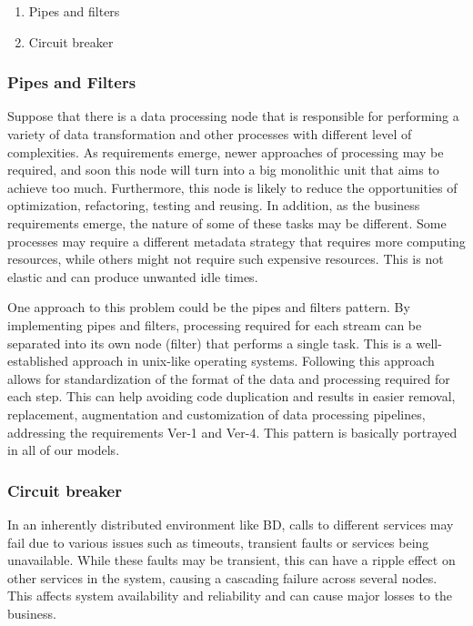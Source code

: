 \documentclass{bmcart}
\begin{document}
\begin{enumerate}
  \item Pipes and filters 
  \item Circuit breaker
\end{enumerate}


\subsubsection{Pipes and Filters}

Suppose that there is a data processing node that is responsible for performing a variety of data transformation and other processes with different level of complexities. As requirements emerge, newer approaches of processing may be required, and soon this node will turn into a big monolithic unit that aims to achieve too much. Furthermore, this node is likely to reduce the opportunities of optimization, refactoring, testing and reusing. In addition, as the business requirements emerge, the nature of some of these tasks may be different. Some processes may require a different metadata strategy that requires more computing resources, while others might not require such expensive resources. This is not elastic and can produce unwanted idle times. 

One approach to this problem could be the pipes and filters pattern. By implementing pipes and filters, processing required for each stream can be separated into its own node (filter) that performs a single task. This is a well-established approach in unix-like operating systems. Following this approach allows for standardization of the format of the data and processing required for each step. This can help avoiding code duplication and results in easier removal, replacement, augmentation and customization of data processing pipelines, addressing the requirements Ver-1 and Ver-4. This pattern is basically portrayed in all of our models.

\subsubsection{Circuit breaker}
 
In an inherently distributed environment like BD, calls to different services may fail due to various issues such as timeouts, transient faults or services being unavailable. While these faults may be transient, this can have a ripple effect on other services in the system, causing a cascading failure across several nodes. This affects system availability and reliability and can cause major losses to the business. 
\end{document}
